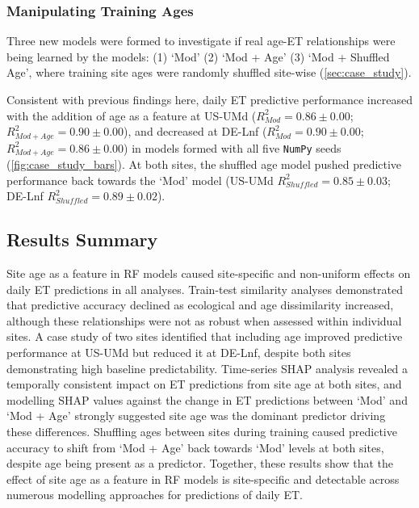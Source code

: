 \subsubsection{Manipulating Training Ages} \label{case:4}
Three new models were formed to investigate if real age-\ac{ET} relationships were being learned by the models: (1) `Mod' (2) `Mod + Age' (3) `Mod + Shuffled Age', where training site ages were randomly shuffled site-wise (\ref{sec:case_study}).
\par Consistent with previous findings here, daily \ac{ET} predictive performance increased with the addition of age as a feature at US-UMd ($R^2_{Mod} = 0.86 \pm 0.00$; $R^2_{Mod + Age} = 0.90 \pm 0.00$), and decreased at DE-Lnf ($R^2_{Mod} = 0.90\pm 0.00$; $R^2_{Mod + Age} = 0.86\pm 0.00$) in models formed with all five \texttt{NumPy} seeds (\autoref{fig:case_study_bars}). At both sites, the shuffled age model pushed predictive performance back towards the `Mod' model (US-UMd $R^2_{Shuffled} = 0.85 \pm 0.03$; DE-Lnf $R^2_{Shuffled} = 0.89 \pm 0.02$). 


\subsection{Results Summary}
Site age as a feature in \ac{RF} models caused site-specific and non-uniform effects on daily \ac{ET} predictions in all analyses. Train-test similarity analyses demonstrated that predictive accuracy declined as ecological and age dissimilarity increased, although these relationships were not as robust when assessed within individual sites. A case study of two sites identified that including age improved predictive performance at US-UMd but reduced it at DE-Lnf, despite both sites demonstrating high baseline predictability. Time-series \ac{SHAP} analysis revealed a temporally consistent impact on \ac{ET} predictions from site age at both sites, and modelling \ac{SHAP} values against the change in \ac{ET} predictions between `Mod' and `Mod + Age' strongly suggested site age was the dominant predictor driving these differences. Shuffling ages between sites during training caused predictive accuracy to shift from `Mod + Age' back towards `Mod' levels at both sites, despite age being present as a predictor. Together, these results show that the effect of site age as a feature in \ac{RF} models is site-specific and detectable across numerous modelling approaches for predictions of daily \ac{ET}.





